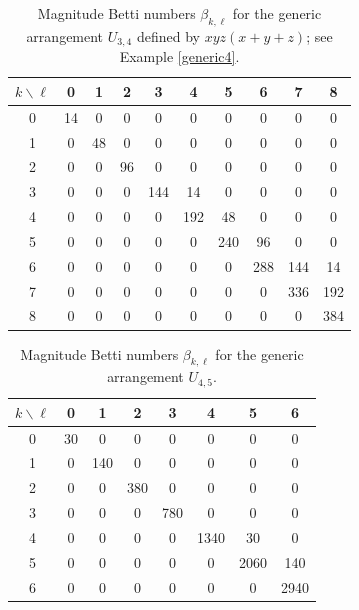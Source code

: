 \documentclass{amsart}
\numberwithin{equation}{section}
\theoremstyle{plain}
\theoremstyle{remark}
\theoremstyle{definition}
\numberwithin{equation}{section}
\begin{document}
\begin{table}[htpb]
\centering
\begin{tabular}{c|ccccccccc}
\hline
$k \backslash \ell$ & 0 & 1 & 2 & 3 & 4 & 5 & 6 & 7 & 8 \\
\hline
0 & 14 & 0  & 0  & 0   & 0   & 0   & 0   & 0   &  0\\
1 & 0  & 48 & 0  & 0   & 0   & 0   & 0   & 0   &  0\\
2 & 0  & 0  & 96 & 0  & 0   & 0   & 0   & 0   &  0\\
3 & 0  & 0  & 0  & 144 & 14  & 0  & 0   & 0   & 0\\
4 & 0  & 0  & 0  & 0   & 192 & 48  & 0  & 0   & 0\\
5 & 0  & 0  & 0  & 0   & 0   & 240 & 96  & 0 & 0\\
6 & 0  & 0  & 0  & 0   & 0   & 0   & 288 & 144  & 14\\
7 & 0  & 0  & 0  & 0   & 0   & 0   & 0   & 336 & 192\\
8 & 0  & 0  & 0  & 0   & 0   & 0   & 0   & 0   & 384\\ 
\hline
\end{tabular}
\vspace{1ex}
\caption{Magnitude Betti numbers $\beta_{k,\ell}$ for the generic arrangement $U_{3,4}$ defined by $xyz(x+y+z)$; see Example \ref{generic4}.}
\label{tab:generic4}
\end{table}


\begin{table}[htpb]
\centering
\begin{tabular}{c|ccccccc}
\hline
$k \backslash \ell$ & 0 & 1 & 2 & 3 & 4 & 5 & 6  \\
\hline
0 & 30 & 0  & 0  & 0   & 0   & 0    & 0  \\
1 & 0  & 140 & 0  & 0   & 0   & 0     & 0 \\
2 & 0  & 0  & 380 & 0  & 0   & 0    & 0  \\
3 & 0  & 0  & 0  & 780 & 0  & 0   & 0  \\
4 & 0  & 0  & 0  & 0   & 1340 & 30  & 0  \\
5 & 0  & 0  & 0  & 0   & 0   & 2060   & 140 \\
6 & 0  & 0  & 0  & 0  & 0   &  0   & 2940\\
\hline
\end{tabular}
\vspace{1ex}
\caption{Magnitude Betti numbers $\beta_{k,\ell}$ for the generic arrangement $U_{4,5}$.}
\label{tab:U45}
\end{table}
\end{document}
